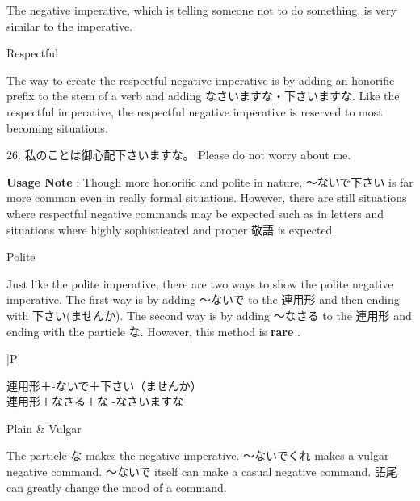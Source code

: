 \par{ The negative imperative, which is telling someone not to do something, is very similar to the imperative. }

\par{Respectful }

\par{The way to create the respectful negative imperative is by adding an honorific prefix to the stem of a verb and adding なさいますな・下さいますな. Like the respectful imperative, the respectful negative imperative is reserved to most becoming situations. }

\par{26. 私のことは御心配下さいますな。 \hfill\break
Please do not worry about me. }

\par{\textbf{Usage Note }: Though more honorific and polite in nature, ～ないで下さい is far more common even in really formal situations. However, there are still situations where respectful negative commands may be expected such as in letters and situations where highly sophisticated and proper 敬語 is expected. }

\begin{center}
 Polite 
\end{center}

\par{Just like the polite imperative, there are two ways to show the polite negative imperative. The first way is by adding ～ないで to the 連用形 and then ending with 下さい(ませんか). The second way is by adding ～なさる to the 連用形 and ending with the particle な. However, this method is \textbf{rare }. }

\begin{ltabulary}{|P|}
\hline 

連用形＋-ないで＋下さい（ませんか） \\

連用形＋なさる＋な \textrightarrow  -なさいますな \\

\end{ltabulary}

\par{Plain \& Vulgar }

\par{The particle な makes the negative imperative. ～ないでくれ makes a vulgar negative command. ～ないで itself can make a casual negative command. 語尾 can greatly change the mood of a command. \hfill\break
}

